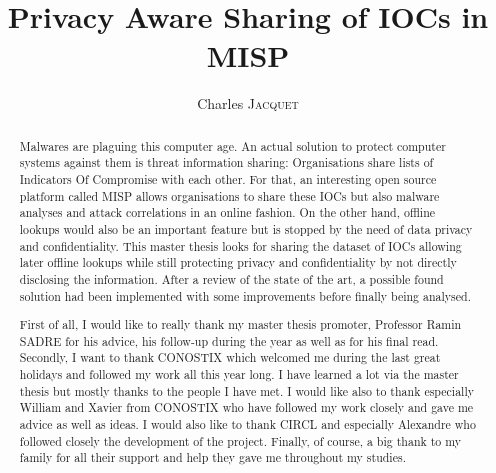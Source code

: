 \documentclass{eplmastersthesis}
\title{Privacy Aware Sharing of IOCs in MISP}	%
\author{Charles \textsc{Jacquet}}	%
\begin{document}
\maketitle					%
\thispagestyle{empty}		%


\begin{abstract} 
Malwares are plaguing this computer age. An actual solution to protect computer systems against them is threat information sharing: Organisations share lists of Indicators Of Compromise with each other.
For that, an interesting open source platform called MISP allows organisations to share these IOCs but also malware analyses and attack correlations in an online fashion.
On the other hand, offline lookups would also be an important feature but is stopped by the need of data privacy and confidentiality. This master thesis looks for sharing the dataset of IOCs allowing later offline lookups while still protecting privacy and confidentiality by not directly disclosing the information. 
After a review of the state of the art, a possible found solution had been implemented with  some improvements before finally being analysed.
\end{abstract}


\renewcommand{\abstractname}{Acknowledgements}
\begin{abstract}
First of all, I would like to really thank my master thesis promoter, Professor Ramin SADRE for his advice, his follow-up during the year as well as for his final read.
Secondly, I want to thank CONOSTIX which welcomed me during the last great holidays and followed my work all this year long. I have learned a lot via the master thesis but mostly thanks to the people I have met. I would like also to thank especially William and Xavier from CONOSTIX who have followed my work closely and gave me advice as well as ideas. I would also like to thank CIRCL and especially Alexandre who followed closely the development of the project. Finally, of course, a big thank to my family for all their support and help they gave me throughout my studies.
\end{abstract}

\tableofcontents
\end{document}
